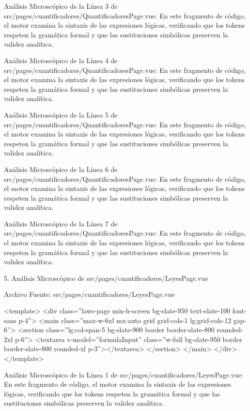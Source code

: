 \documentclass[11pt,a4paper]{article}
\begin{document}
Análisis Microscópico de la Línea 3 de
src/pages/cuantificadores/QuantificadoresPage.vue: En este fragmento de
código, el motor examina la sintaxis de las expresiones lógicas,
verificando que los tokens respeten la gramática formal y que las
sustituciones simbólicas preserven la validez analítica.

Análisis Microscópico de la Línea 4 de
src/pages/cuantificadores/QuantificadoresPage.vue: En este fragmento de
código, el motor examina la sintaxis de las expresiones lógicas,
verificando que los tokens respeten la gramática formal y que las
sustituciones simbólicas preserven la validez analítica.

Análisis Microscópico de la Línea 5 de
src/pages/cuantificadores/QuantificadoresPage.vue: En este fragmento de
código, el motor examina la sintaxis de las expresiones lógicas,
verificando que los tokens respeten la gramática formal y que las
sustituciones simbólicas preserven la validez analítica.

Análisis Microscópico de la Línea 6 de
src/pages/cuantificadores/QuantificadoresPage.vue: En este fragmento de
código, el motor examina la sintaxis de las expresiones lógicas,
verificando que los tokens respeten la gramática formal y que las
sustituciones simbólicas preserven la validez analítica.

Análisis Microscópico de la Línea 7 de
src/pages/cuantificadores/QuantificadoresPage.vue: En este fragmento de
código, el motor examina la sintaxis de las expresiones lógicas,
verificando que los tokens respeten la gramática formal y que las
sustituciones simbólicas preserven la validez analítica.

5. Análisis Microscópico de src/pages/cuantificadores/LeyesPage.vue

 Archivo Fuente: src/pages/cuantificadores/LeyesPage.vue

\medskip\hrulefill\medskip
<template>
<div class=''laws-page min-h-screen bg-slate-950 text-slate-100
font-sans p-4''>
<main class=''max-w-6xl mx-auto grid grid-cols-1 lg:grid-cols-12 gap-6''>
<section class=''lg:col-span-5 bg-slate-900 border border-slate-800
rounded-2xl p-6''>
<textarea v-model=''formulaInput'' class=''w-full bg-slate-950 border
border-slate-800 rounded-xl p-3''></textarea>
</section>
</main>
</div>
</template>
\medskip\hrulefill\medskip

\medskip\hrulefill\medskip

Análisis Microscópico de la Línea 1 de
src/pages/cuantificadores/LeyesPage.vue: En este fragmento de código, el
motor examina la sintaxis de las expresiones lógicas, verificando que
los tokens respeten la gramática formal y que las sustituciones
simbólicas preserven la validez analítica.
\end{document}
